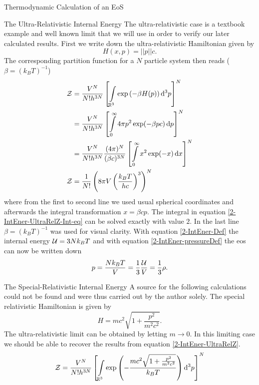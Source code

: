 \begin{section}{Thermodynamic Calculation of an EoS}
\begin{subsection}{The Ultra-Relativistic Internal Energy}
The ultra-relativistic case is a textbook example and well known limit that we will use in order to verify our later calculated results. 
First we write down the ultra-relativistic Hamiltonian given by 
\begin{equation}
	H(x,p)=||p||c.
\end{equation}
The corresponding partition function for a $N$ particle system then reads ($\beta=(k_BT)^{-1}$)
\begin{align}
	\mathcal{Z} 	&= \frac{V^N}{N!h^{3N}}\left[\int\limits_{\mathbb{R}^3}\exp\left(- \beta H(p)\right)\mathop{}\!\mathrm{d}^3p\right]^N\\
		&= \frac{V^N}{N!h^{3N}}\left[\int\limits_0^\infty4\pi p^2\exp(-\beta pc) \mathop{}\!\mathrm{d} p\right]^N\\
		&= \frac{V^N}{N!h^{3N}}\frac{(4\pi)^N}{(\beta c)^{3N}}\left[\int\limits_0^\infty x^2\exp(-x) \mathop{}\!\mathrm{d} x\right]^N\label{2-IntEner-UltraRelZ-Int-eq}\\
	\mathcal{Z}	&= \frac{1}{N!}\left(8\pi V\left(\frac{k_BT}{hc}\right)^3\right)^N
	\label{2-IntEner-UltraRelZ}
\end{align}
where from the first to second line we used usual spherical coordinates and afterwards the integral transformation $x=\beta cp$.
The integral in equation \eqref{2-IntEner-UltraRelZ-Int-eq} can be solved exactly with value $2$. 
In the last line $\beta=(k_BT)^{-1}$ was used for visual clarity.
With equation \eqref{2-IntEner-Def} the internal energy $\mathcal{U} = 3Nk_BT$ and with equation \eqref{2-IntEner-pressureDef} the \ac{eos} can now be written down
\begin{equation}
	p = \frac{Nk_BT}{V} = \frac{1}{3}\frac{\mathcal{U}}{V} = \frac{1}{3}\rho.
	\label{2-IntEner-eos-nonrel}
\end{equation}
\end{subsection}
%
%
%
\begin{subsection}{The Special-Relativistic Internal Energy}
A source for the following calculations could not be found and were thus carried out by the author solely.
The special relativistic Hamiltonian is given by
\begin{equation}
	H=mc^2\sqrt{1+\frac{p^2}{m^2c^2}}.
\end{equation}
The ultra-relativistic limit can be obtained by letting $m\rightarrow0$. In this limiting case we should be able to recover the results from equation \eqref{2-IntEner-UltraRelZ}.
\begin{align}
	\Z 	&= \frac{V^N}{N!h^{3N}}\left[\int\limits_{\R^3}\exp\left(- \frac{mc^2\sqrt{1+\frac{p^2}{m^2c^2}}}{k_BT}\right)\diff^3p\right]^N\label{2-IntEner-EQ1}\\

\end{align}
\end{subsection}
\end{section}
